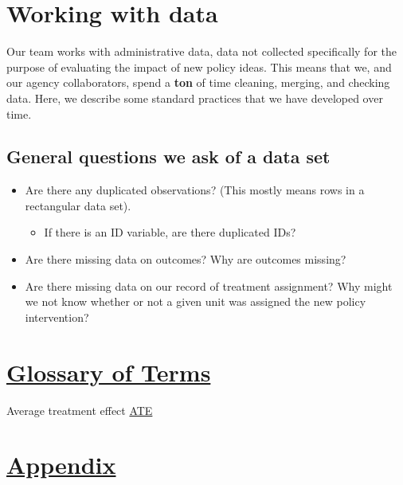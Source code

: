 \documentclass[
  12pt,
]{book}
\providecommand{\tightlist}{%
  \setlength{\itemsep}{0pt}\setlength{\parskip}{0pt}}
\theoremstyle{definition}
\theoremstyle{definition}
\theoremstyle{definition}
\theoremstyle{remark}
\begin{document}
\hypertarget{working-with-data}{%
\chapter{Working with data}\label{working-with-data}}

Our team works with administrative data, data not collected specifically
for the purpose of evaluating the impact of new policy ideas. This means
that we, and our agency collaborators, spend a \textbf{ton} of time
cleaning, merging, and checking data. Here, we describe some standard
practices that we have developed over time.

\hypertarget{general-questions-we-ask-of-a-data-set}{%
\section{General questions we ask of a data
set}\label{general-questions-we-ask-of-a-data-set}}

\begin{itemize}
\tightlist
\item
  Are there any duplicated observations? (This mostly means rows in a
  rectangular data set).

  \begin{itemize}
  \tightlist
  \item
    If there is an ID variable, are there duplicated IDs?
  \end{itemize}
\item
  Are there missing data on outcomes? Why are outcomes missing?
\item
  Are there missing data on our record of treatment assignment? Why
  might we not know whether or not a given unit was assigned the new
  policy intervention?
\end{itemize}

\hypertarget{glossary-of-terms}{%
\chapter{\texorpdfstring{\protect\hyperlink{glossary}{Glossary of
Terms}}{Glossary of Terms}}\label{glossary-of-terms}}

Average treatment effect \protect\hyperlink{ATE}{ATE}

\hypertarget{appendix}{%
\chapter{\texorpdfstring{\protect\hyperlink{appendix}{Appendix}}{Appendix}}\label{appendix}}

  
\end{document}
